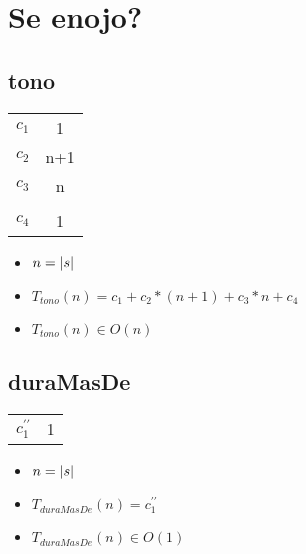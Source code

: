 \documentclass{article}
\begin{document}
    \section*{Se enojo?}

    \subsection*{tono}

    \begin{minipage}{0.70\textwidth}
        
    \end{minipage}
    \hfill
    \begin{minipage}{0.25\textwidth}
        \begin{tabular}{|c|c}

            $c_1$ & 1 \\
            $c_2$ & n+1 \\
            $c_3$ & n \\
            $   $ &   \\
            $c_4$ & 1 \\

        \end{tabular}
    \end{minipage}

    \begin{itemize}
        \item $n = |s|$
        \item $T_{tono}(n) = c_1 + c_2 * (n + 1) + c_3 * n + c_4 $
        \item $T_{tono}(n) \in O(n)$
    \end{itemize}

    \subsection*{duraMasDe}
    \begin{minipage}{0.70\textwidth}
        
    \end{minipage}
    \hfill
    \begin{minipage}{0.25\textwidth}
        \begin{tabular}{|c|c}
            $c^{\prime\prime}_1$ & 1 \\

        \end{tabular}
    \end{minipage}

    \begin{itemize}
        \item $n = |s|$
        \item $T_{duraMasDe}(n) = c^{\prime\prime}_1 $
        \item $T_{duraMasDe}(n) \in O(1)$
    \end{itemize}
\end{document}
